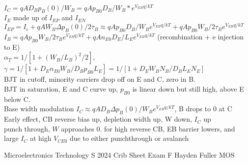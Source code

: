 \documentclass{article}
\begin{document}
\begin{large}
\\$I_C=qAD_B p_B(0)/W_B=qAp_{B0}D_B/W_B*e^{V_{EB} q/kT}$
\\$I_E$ made up of $I_{EP}$ and $I_{EN}$
\\$I_{EP}=I_c+qAW_B\Delta p_B(0)/2\tau_B\approx qAp_{B0}D_B/W_B e^{V_{EB} q/kT}+qAp_{B0}W_B/2\tau_B e^{V_{EB} q/kT}$
\\$I_B=qAp_{B0}W_B/2\tau_B e^{V_{EB} q/kT}+qAn_{E0}D_E/L_Ee^{V_{EB}q/kT}$ (recombination + e injection to E)
\\$\alpha_T=1/[1+(W_B/L_B)^2/2]$, $\gamma=1/[1+D_En_{E0}W_B/D_Bp_{B0}L_E]=1/[1+D_EW_BN_B/D_BL_EN_E]$
\\BJT in cutoff, minority carriers drop off on E and C, zero in B.  
\\BJT in saturation, E and C curve up, $p_{B0}$ is linear down but still high, above E below C.
\\Base width modulation $I_C\approx qAD_B \Delta p_B(0)/W_B e^{V_{EB}q/kT}$, B drops to 0 at C
\\Early effect, CB reverse bias up, depletion width up, W down, $I_C$ up
\\punch through, $W$ approaches $0$. for high reverse CB, EB barrier lowers, and large $I_C$ at high $V_{CE0}$ due to either punchthrough or avalanch
\end{large}
 Microelectronics Technology S 2024 Crib Sheet Exam F Hayden Fuller MOS
\end{document}
